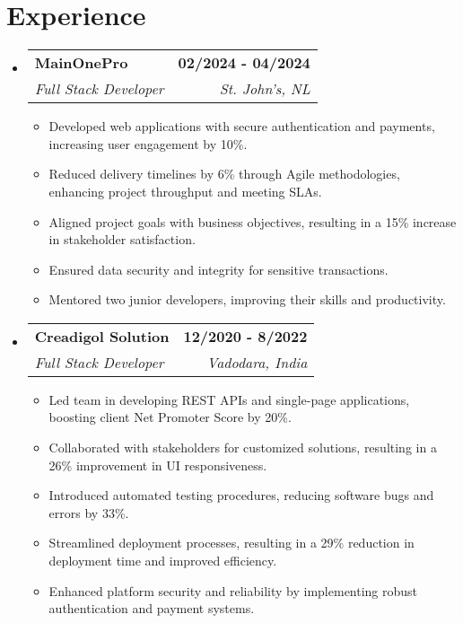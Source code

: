 \documentclass[letterpaper,11pt]{article}
\makeatletter
\newcommand{\resumeItem}[1]{
  \item\small{
    {#1 \vspace{-2pt}}
  }
}
\newcommand{\resumeSubheading}[4]{
  \vspace{-2pt}\item
    \begin{tabular*}{1.0\textwidth}[t]{l@{\extracolsep{\fill}}r}
      \textbf{#1} & \textbf{\small #2} \\
      \textit{\small#3} & \textit{\small #4} \\
    \end{tabular*}\vspace{-7pt}
}
\newcommand{\resumeSubHeadingListStart}{\begin{itemize}[leftmargin=0.0in, label={}]}
\newcommand{\resumeSubHeadingListEnd}{\end{itemize}}
\newcommand{\resumeItemListStart}{\begin{itemize}}
\newcommand{\resumeItemListEnd}{\end{itemize}\vspace{-5pt}}
\makeatother
\begin{document}
\section{Experience}
  \resumeSubHeadingListStart
    \resumeSubheading
      {MainOnePro}{02/2024 - 04/2024}
      {Full Stack Developer}{St. John's, NL}
      \resumeItemListStart
        \resumeItem{Developed web applications with secure authentication and payments, increasing user engagement by 10\%.}
        \resumeItem{Reduced delivery timelines by 6\% through Agile methodologies, enhancing project throughput and meeting SLAs.}
        \resumeItem{Aligned project goals with business objectives, resulting in a 15\% increase in stakeholder satisfaction.}
        \resumeItem{Ensured data security and integrity for sensitive transactions.}
        \resumeItem{Mentored two junior developers, improving their skills and productivity.}
      \resumeItemListEnd
    \resumeSubheading
      {Creadigol Solution}{12/2020 - 8/2022}
      {Full Stack Developer}{Vadodara, India}
      \resumeItemListStart
        \resumeItem{Led team in developing REST APIs and single-page applications, boosting client Net Promoter Score by 20\%.}
        \resumeItem{Collaborated with stakeholders for customized solutions, resulting in a 26\% improvement in UI responsiveness.}
        \resumeItem{Introduced automated testing procedures, reducing software bugs and errors by 33\%.}
        \resumeItem{Streamlined deployment processes, resulting in a 29\% reduction in deployment time and improved efficiency.}
        \resumeItem{Enhanced platform security and reliability by implementing robust authentication and payment systems.}
      \resumeItemListEnd
  \resumeSubHeadingListEnd
\vspace{-16pt}
\end{document}

